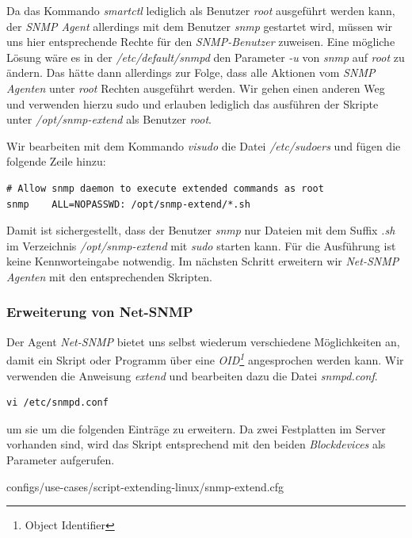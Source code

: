 Da das Kommando \emph{smartctl} lediglich als Benutzer \emph{root} ausgeführt werden kann, der \emph{SNMP Agent} allerdings mit dem Benutzer \emph{snmp} gestartet wird, müssen wir uns hier entsprechende Rechte für den \emph{SNMP-Benutzer} zuweisen. Eine mögliche Lösung wäre es in der \emph{/etc/default/snmpd} den Parameter \emph{-u} von \emph{snmp} auf \emph{root} zu ändern. Das hätte dann allerdings zur Folge, dass alle Aktionen vom \emph{SNMP Agenten} unter \emph{root} Rechten ausgeführt werden. Wir gehen einen anderen Weg und verwenden hierzu sudo und erlauben lediglich das ausführen der Skripte unter \emph{/opt/snmp-extend} als Benutzer \emph{root}.

Wir bearbeiten mit dem Kommando \emph{visudo} die Datei \emph{/etc/sudoers} und fügen die folgende Zeile hinzu:

\begin{lstlisting}[numbers=none]
# Allow snmp daemon to execute extended commands as root
snmp    ALL=NOPASSWD: /opt/snmp-extend/*.sh
\end{lstlisting}

Damit ist sichergestellt, dass der Benutzer \emph{snmp} nur Dateien mit dem Suffix \emph{.sh} im Verzeichnis \emph{/opt/snmp-extend} mit \emph{sudo} starten kann. Für die Ausführung ist keine Kennworteingabe notwendig. Im nächsten Schritt erweitern wir \emph{Net-SNMP Agenten} mit den entsprechenden Skripten.

\subsubsection{Erweiterung von Net-SNMP}
Der Agent \emph{Net-SNMP} bietet uns selbst wiederum verschiedene Möglichkeiten an, damit ein Skript oder Programm über eine \emph{OID\footnote{Object Identifier}} angesprochen werden kann. Wir verwenden die Anweisung \emph{extend} und bearbeiten dazu die Datei \emph{snmpd.conf}.

\begin{lstlisting}[numbers=none]
vi /etc/snmpd.conf
\end{lstlisting}

um sie um die folgenden Einträge zu erweitern. Da zwei Festplatten im Server vorhanden sind, wird das Skript entsprechend mit den beiden \emph{Blockdevices} als Parameter aufgerufen.


  {configs/use-cases/script-extending-linux/snmp-extend.cfg}

